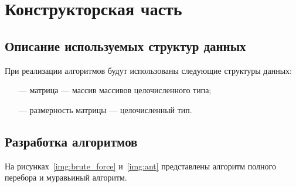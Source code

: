 \chapter{Конструкторская часть}

\section{Описание используемых структур данных}

При реализации алгоритмов будут использованы следующие структуры данных:

\begin{itemize}
	\item[---] матрица --- массив массивов целочисленного типа;
	\item[---] размерность матрицы --- целочисленный тип.
\end{itemize}

\section{Разработка алгоритмов}

На рисунках~\ref{img:brute_force} и~\ref{img:ant} представлены алгоритм полного перебора и муравьиный алгоритм.

